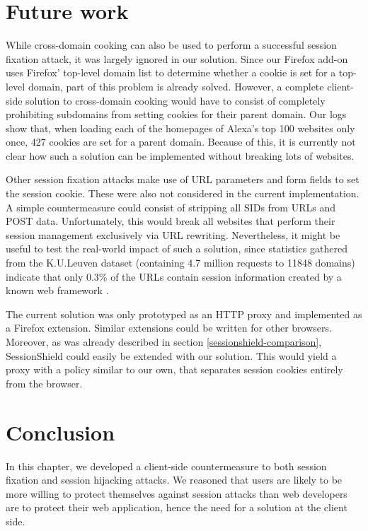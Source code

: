 \section{Future work}

While cross-domain cooking \cite{Zalewski2006} can also be used to perform a successful session fixation attack, it was largely ignored in our solution. Since our Firefox add-on uses Firefox' top-level domain list to determine whether a cookie is set for a top-level domain, part of this problem is already solved. However, a complete client-side solution to cross-domain cooking would have to consist of completely prohibiting subdomains from setting cookies for their parent domain. Our logs show that, when loading each of the homepages of Alexa's top 100 websites only once, 427 cookies are set for a parent domain. Because of this, it is currently not clear how such a solution can be implemented without breaking lots of websites.

Other session fixation attacks make use of URL parameters and form fields to set the session cookie. These were also not considered in the current implementation. A simple countermeasure could consist of stripping all SIDs from URLs and POST data. Unfortunately, this would break all websites that perform their session management exclusively via URL rewriting. Nevertheless, it might be useful to test the real-world impact of such a solution, since statistics gathered from the K.U.Leuven dataset (containing 4.7 million requests to 11848 domains) indicate that only 0.3\% of the URLs contain session information created by a known web framework \cite{DeRyck2010,Bonne2011}.

The current solution was only prototyped as an HTTP proxy and implemented as a Firefox extension. Similar extensions could be written for other browsers. Moreover, as was already described in section \ref{sessionshield-comparison}, SessionShield could easily be extended with our solution. This would yield a proxy with a policy similar to our own, that separates session cookies entirely from the browser.

\section{Conclusion}

In this chapter, we developed a client-side countermeasure to both session fixation and session hijacking attacks. We reasoned that users are likely to be more willing to protect themselves against session attacks than web developers are to protect their web application, hence the need for a solution at the client side.

